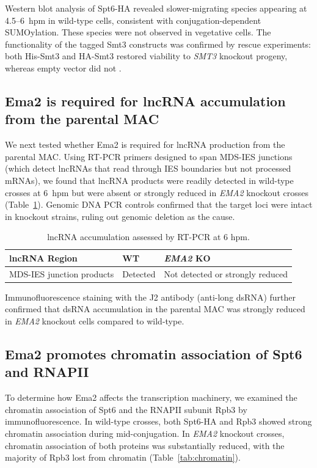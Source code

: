 \documentclass[11pt,a4paper]{article}
\begin{document}
Western blot analysis of Spt6-HA revealed slower-migrating species appearing at 4.5--6~hpm in wild-type cells, consistent with conjugation-dependent SUMOylation. These species were not observed in vegetative cells. The functionality of the tagged Smt3 constructs was confirmed by rescue experiments: both His-Smt3 and HA-Smt3 restored viability to \textit{SMT3} knockout progeny, whereas empty vector did not \citep{Gareau2010}.

\subsection{Ema2 is required for lncRNA accumulation from the parental MAC}

We next tested whether Ema2 is required for lncRNA production from the parental MAC. Using RT-PCR primers designed to span MDS-IES junctions (which detect lncRNAs that read through IES boundaries but not processed mRNAs), we found that lncRNA products were readily detected in wild-type crosses at 6~hpm but were absent or strongly reduced in \textit{EMA2} knockout crosses (Table~\ref{tab:lncrna}). Genomic DNA PCR controls confirmed that the target loci were intact in knockout strains, ruling out genomic deletion as the cause.

\begin{table}[htbp]
\centering
\caption{lncRNA accumulation assessed by RT-PCR at 6 hpm.}
\label{tab:lncrna}
\begin{tabular}{lll}
\toprule
\textbf{lncRNA Region} & \textbf{WT} & \textbf{\textit{EMA2} KO} \\
\midrule
MDS-IES junction products & Detected & Not detected or strongly reduced \\
\bottomrule
\end{tabular}
\end{table}

Immunofluorescence staining with the J2 antibody (anti-long dsRNA) further confirmed that dsRNA accumulation in the parental MAC was strongly reduced in \textit{EMA2} knockout cells compared to wild-type.

\subsection{Ema2 promotes chromatin association of Spt6 and RNAPII}

To determine how Ema2 affects the transcription machinery, we examined the chromatin association of Spt6 and the RNAPII subunit Rpb3 by immunofluorescence. In wild-type crosses, both Spt6-HA and Rpb3 showed strong chromatin association during mid-conjugation. In \textit{EMA2} knockout crosses, chromatin association of both proteins was substantially reduced, with the majority of Rpb3 lost from chromatin (Table~\ref{tab:chromatin}).
\end{document}

